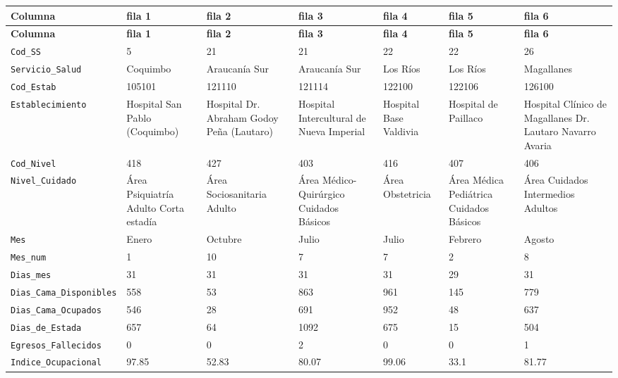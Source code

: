 \documentclass[10pt]{article}
\newcommand{\hdr}[1]{\textbf{\color{white}#1}}
\begin{document}
\footnotesize
\begin{xltabular}{\linewidth}{@{}p{4.3cm} Y Y Y Y Y Y @{}}
\hdr{Columna} & \hdr{fila 1} & \hdr{fila 2} & \hdr{fila 3} & \hdr{fila 4} & \hdr{fila 5} & \hdr{fila 6} \\
\endfirsthead
{}\hdr{Columna} & \hdr{fila 1} & \hdr{fila 2} & \hdr{fila 3} & \hdr{fila 4} & \hdr{fila 5} & \hdr{fila 6} \\
\endhead
{}\texttt{Cod\_\allowbreak{}SS} & 5 & 21 & 21 & 22 & 22 & 26 \\
\texttt{Servicio\_\allowbreak{}Salud} & Coquimbo & Araucanía Sur & Araucanía Sur & Los Ríos & Los Ríos & Magallanes \\
\texttt{Cod\_\allowbreak{}Estab} & 105101 & 121110 & 121114 & 122100 & 122106 & 126100 \\
\texttt{Establecimiento} & Hospital San Pablo (Coquimbo) & Hospital Dr. Abraham Godoy Peña (Lautaro) & Hospital Intercultural de Nueva Imperial & Hospital Base Valdivia & Hospital de Paillaco & Hospital Clínico de Magallanes Dr. Lautaro Navarro Avaria \\
\texttt{Cod\_\allowbreak{}Nivel} & 418 & 427 & 403 & 416 & 407 & 406 \\
\texttt{Nivel\_\allowbreak{}Cuidado} & Área Psiquiatría Adulto Corta estadía & Área Sociosanitaria Adulto & Área Médico-{}Qu\allowbreak{}irúrgico Cuidados Básicos & Área Obstetricia & Área Médica Pediátrica Cuidados Básicos & Área Cuidados Intermedios Adultos \\
\texttt{Mes} & Enero & Octubre & Julio & Julio & Febrero & Agosto \\
\texttt{Mes\_\allowbreak{}num} & 1 & 10 & 7 & 7 & 2 & 8 \\
\texttt{Dias\_\allowbreak{}mes} & 31 & 31 & 31 & 31 & 29 & 31 \\
\texttt{Dias\_\allowbreak{}Cama\_\allowbreak{}Disponibles} & 558 & 53 & 863 & 961 & 145 & 779 \\
\texttt{Dias\_\allowbreak{}Cama\_\allowbreak{}Ocupados} & 546 & 28 & 691 & 952 & 48 & 637 \\
\texttt{Dias\_\allowbreak{}de\_\allowbreak{}Estada} & 657 & 64 & 1092 & 675 & 15 & 504 \\
\texttt{Egresos\_\allowbreak{}Fallecidos} & 0 & 0 & 2 & 0 & 0 & 1 \\
\texttt{Indice\_\allowbreak{}Ocupacional} & 97.85 & 52.83 & 80.07 & 99.06 & 33.1 & 81.77 \\

\end{xltabular}
\end{document}
